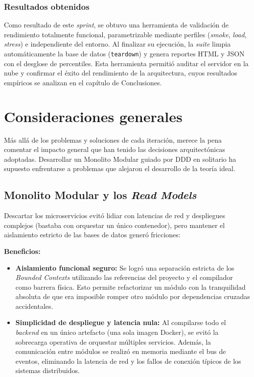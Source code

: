 \subsubsection{Resultados obtenidos}
Como resultado de este \emph{sprint}, se obtuvo una herramienta de validación de rendimiento totalmente funcional, parametrizable mediante perfiles (\emph{smoke}, \emph{load}, \emph{stress}) e independiente del entorno. Al finalizar su ejecución, la \emph{suite} limpia automáticamente la base de datos (\texttt{teardown}) y genera reportes HTML y JSON con el desglose de percentiles. Esta herramienta permitió auditar el servidor en la nube y confirmar el éxito del rendimiento de la arquitectura, cuyos resultados empíricos se analizan en el capítulo de Conclusiones.

\section{Consideraciones generales}
Más allá de los problemas y soluciones de cada iteración, merece la pena comentar el impacto general que han tenido las decisiones arquitectónicas adoptadas. Desarrollar un Monolito Modular guiado por \ac{DDD} en solitario ha supuesto enfrentarse a problemas que alejaron el desarrollo de la teoría ideal.

\subsection{Monolito Modular y los \emph{Read Models}}
Descartar los microservicios evitó lidiar con latencias de red y despliegues complejos (bastaba con orquestar un único contenedor), pero mantener el aislamiento estricto de las bases de datos generó fricciones:

\textbf{Beneficios:}
\begin{itemize}
    \item \textbf{Aislamiento funcional seguro:} Se logró una separación estricta de los \emph{Bounded Contexts} utilizando las referencias del proyecto y el compilador como barrera física. Esto permite refactorizar un módulo con la tranquilidad absoluta de que era imposible romper otro módulo por dependencias cruzadas accidentales.
    \item \textbf{Simplicidad de despliegue y latencia nula:} Al compilarse todo el \emph{backend} en un único artefacto (una sola imagen Docker), se evitó la sobrecarga operativa de orquestar múltiples servicios. Además, la comunicación entre módulos se realizó en memoria mediante el bus de eventos, eliminando la latencia de red y los fallos de conexión típicos de los sistemas distribuidos.
\end{itemize}

